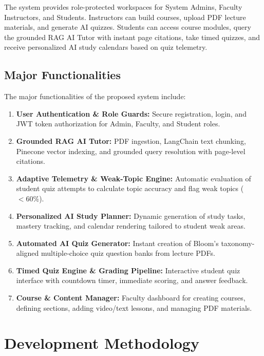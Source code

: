 The system provides role-protected workspaces for System Admins, Faculty Instructors, and Students. Instructors can build courses, upload PDF lecture materials, and generate AI quizzes. Students can access course modules, query the grounded RAG AI Tutor with instant page citations, take timed quizzes, and receive personalized AI study calendars based on quiz telemetry.

\subsection{Major Functionalities}

The major functionalities of the proposed system include:

\begin{enumerate}
    \item \textbf{User Authentication \& Role Guards:} Secure registration, login, and JWT token authorization for Admin, Faculty, and Student roles.
    
    \item \textbf{Grounded RAG AI Tutor:} PDF ingestion, LangChain text chunking, Pinecone vector indexing, and grounded query resolution with page-level citations.
    
    \item \textbf{Adaptive Telemetry \& Weak-Topic Engine:} Automatic evaluation of student quiz attempts to calculate topic accuracy and flag weak topics ($<60\%$).
    
    \item \textbf{Personalized AI Study Planner:} Dynamic generation of study tasks, mastery tracking, and calendar rendering tailored to student weak areas.
    
    \item \textbf{Automated AI Quiz Generator:} Instant creation of Bloom's taxonomy-aligned multiple-choice quiz question banks from lecture PDFs.
    
    \item \textbf{Timed Quiz Engine \& Grading Pipeline:} Interactive student quiz interface with countdown timer, immediate scoring, and answer feedback.
    
    \item \textbf{Course \& Content Manager:} Faculty dashboard for creating courses, defining sections, adding video/text lessons, and managing PDF materials.
\end{enumerate}

\section{Development Methodology}

